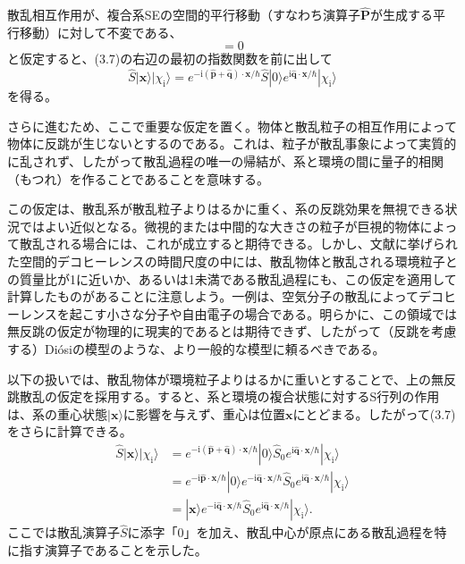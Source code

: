 散乱相互作用が、複合系SEの空間的平行移動（すなわち演算子$\hat{\bm P}$が生成する平行移動）に対して不変である、
\begin{equation}
[\hat S,\hat{\bm P}]=0
\tag{3.8}
\end{equation}
と仮定すると、(3.7)の右辺の最初の指数関数を前に出して
\begin{equation}
\hat S|\bm x\rangle|\chi_{\mathrm i}\rangle
=e^{-\mathrm i(\hat{\bm p}+\hat{\bm q})\cdot\bm x/\hbar}\hat S|0\rangle e^{\mathrm i\hat{\bm q}\cdot\bm x/\hbar}|\chi_{\mathrm i}\rangle
\tag{3.9}
\end{equation}
を得る。

さらに進むため、ここで重要な仮定を置く。物体と散乱粒子の相互作用によって物体に反跳が生じないとするのである。これは、粒子が散乱事象によって実質的に乱されず、したがって散乱過程の唯一の帰結が、系と環境の間に量子的相関（もつれ）を作ることであることを意味する。

この仮定は、散乱系が散乱粒子よりはるかに重く、系の反跳効果を無視できる状況ではよい近似となる。微視的または中間的な大きさの粒子が巨視的物体によって散乱される場合には、これが成立すると期待できる。しかし、文献に挙げられた空間的デコヒーレンスの時間尺度の中には、散乱物体と散乱される環境粒子との質量比が1に近いか、あるいは1未満である散乱過程にも、この仮定を適用して計算したものがあることに注意しよう。一例は、空気分子の散乱によってデコヒーレンスを起こす小さな分子や自由電子の場合である\cite{ref166}。明らかに、この領域では無反跳の仮定が物理的に現実的であるとは期待できず、したがって（反跳を考慮する）Diósiの模型\cite{ref159}のような、より一般的な模型に頼るべきである。

以下の扱いでは、散乱物体が環境粒子よりはるかに重いとすることで、上の無反跳散乱の仮定を採用する。すると、系と環境の複合状態に対するS行列の作用は、系の重心状態$|\bm x\rangle$に影響を与えず、重心は位置$\bm x$にとどまる。したがって(3.7)をさらに計算できる。
\begin{equation}
\begin{aligned}
\hat S|\bm x\rangle|\chi_{\mathrm i}\rangle
&=e^{-\mathrm i(\hat{\bm p}+\hat{\bm q})\cdot\bm x/\hbar}|0\rangle\hat S_0e^{\mathrm i\hat{\bm q}\cdot\bm x/\hbar}|\chi_{\mathrm i}\rangle\\
&=e^{-\mathrm i\hat{\bm p}\cdot\bm x/\hbar}|0\rangle e^{-\mathrm i\hat{\bm q}\cdot\bm x/\hbar}\hat S_0e^{\mathrm i\hat{\bm q}\cdot\bm x/\hbar}|\chi_{\mathrm i}\rangle\\
&=|\bm x\rangle e^{-\mathrm i\hat{\bm q}\cdot\bm x/\hbar}\hat S_0e^{\mathrm i\hat{\bm q}\cdot\bm x/\hbar}|\chi_{\mathrm i}\rangle.
\end{aligned}\tag{3.10}
\end{equation}
ここでは散乱演算子$\hat S$に添字「0」を加え、散乱中心が原点にある散乱過程を特に指す演算子であることを示した。

